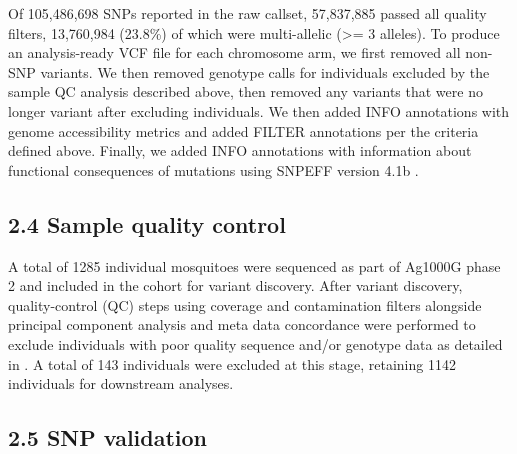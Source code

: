\documentclass[a4paper,11pt,abstracton,hidelinks]{scrartcl}
\begin{document}
%
Of 105,486,698 SNPs reported in the raw callset, 57,837,885 passed all quality filters, 13,760,984 (23.8\%) of which were multi-allelic (>= 3 alleles).
%
To produce an analysis-ready VCF file for each chromosome arm, we first removed all non-SNP variants. 
%
We then removed genotype calls for individuals excluded by the sample QC analysis described above, then removed any variants that were no longer variant after excluding individuals. 
%
We then added INFO annotations with genome accessibility metrics and added FILTER annotations per the criteria defined above. 
%
Finally, we added INFO annotations with information about functional consequences of mutations using SNPEFF version 4.1b \cite{Cingolani2012}.


\subsection*{2.4 Sample quality control}
%
A total of 1285 individual mosquitoes were sequenced as part of Ag1000G phase 2 and included in the cohort for variant discovery. 
%
After variant discovery, quality-control (QC) steps using coverage and contamination filters alongside principal component analysis and meta data concordance were performed to exclude individuals with poor quality sequence and/or genotype data as detailed in \cite{Ag1000gConsortium2017}.
%
A total of 143 individuals were excluded at this stage, retaining 1142 individuals for downstream analyses.



\subsection*{2.5 SNP validation}
\end{document}
